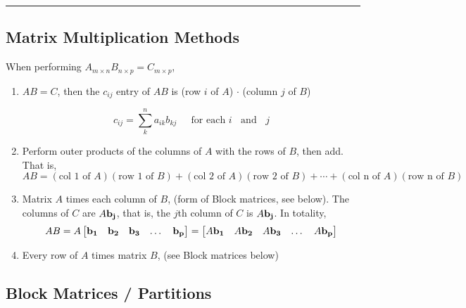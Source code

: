 \rule[0.01in]{\textwidth}{0.0025in}

 

\subsection*{Matrix Multiplication Methods}
When performing $A_{m \times n}B_{n \times p} = C_{m \times p}$, 
\begin{enumerate}
	\item $AB=C$, then the $c_{ij}$ entry of $AB$ is (row $i$ of $A$) $\cdot$ (column $j$ of $B$)
	
	\[  c_{ij}  = \sum_{k}^n a_{ik} b_{kj}   \;\;\;\; \text{ for each } i \;\; \text{ and } \;\; j \]   
	
	\item Perform outer products of the columns of $A$ with the rows of $B$, then add.  That is, 
	\[ AB = (\text{col 1 of }A)(\text{row 1 of  }B) +  (\text{col 2 of }A)(\text{row 2 of  }B) + \cdots + (\text{col n of }A)(\text{row n of  }B) \]



	\item Matrix $A$ times each column of $B$, (form of Block matrices, see below). The columns of $C$ are $A {\bf b_j}$, that is, the $j$th column of $C$ is $A {\bf b_j}$.  In totality, 
	\[  A B = A \begin{bmatrix} {\bf b_1}   &  {\bf b_2}   &   {\bf b_3} &  \dots & {\bf b_p} \end{bmatrix}  =\begin{bmatrix} A{\bf b_1} &   A{\bf b_2}   &  A{\bf b_3} &  \dots & A{\bf b_p} \end{bmatrix} \]
	
	\item Every row of $A$ times matrix $B$,  (see Block matrices below)
	
	\end{enumerate}







 



\subsection*{Block Matrices / Partitions}



